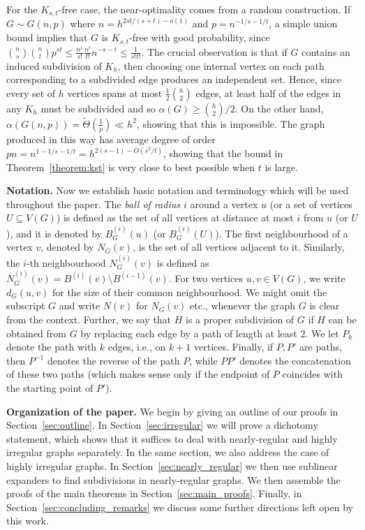 \documentclass[10pt, a4paper]{article}
\numberwithin{theorem}{section} %
\theoremstyle{remark}
\theoremstyle{definition}
\begin{document}
For the $K_{s,t}$-free case, the near-optimality comes from a random construction. If $G\sim G(n, p)$ where $n= h^{2st/(s+t)-o(1)}$ and $p=n^{-1/s-1/t}$, a simple union bound implies that $G$ is $K_{s, t}$-free with good probability, since $\binom{n}{s}\binom{n}{t}p^{st}\leq \frac{n^s}{s!}\frac{n^t}{t!}n^{-s-t}\leq \frac{1}{s!t!}$. The crucial observation is that if $G$ contains an induced subdivision of $K_h$, then choosing one internal vertex on each path corresponding to a subdivided edge produces an independent set. Hence, since every set of $h$ vertices spans at most $\frac{1}{2}\binom{h}{2}$ edges, at least half of the edges in any $K_h$ must be subdivided and so $\alpha(G)\ge \binom{h}{2}/2$. On the other hand, $\alpha(G(n,p))=\tilde \Theta(\frac{1}{p})\ll h^2$, showing that this is impossible. The graph produced in this way has average degree of order $pn=n^{1-1/s-1/t}=h^{2(s-1)-O(s^2/t)}$, showing that the bound in Theorem~\ref{theorem:kst} is very close to best possible when $t$ is large. 

\medskip
\noindent
\textbf{Notation.} Now we establish basic notation and terminology which will be used throughout the paper.  The \textit{ball of radius $i$} around a vertex $u$ (or a set of vertices $U\subseteq V(G)$) is defined as the set of all vertices at distance at most $i$ from $u$ (or $U$), and it is denoted by $B_G^{(i)}(u)$ (or $B_G^{(i)}(U)$).
The first neighbourhood of a vertex $v$, denoted by $N_G(v)$, is the set of all vertices adjacent to it. Similarly, the $i$-th neighbourhood $N_G^{(i)}(v)$ is defined as $N_G^{(i)}(v)=B^{(i)}(v) \setminus B^{(i-1)}(v)$.
For two vertices $u, v\in V(G)$, we write $d_G(u, v)$ for the size of their common neighbourhood.
We might omit the subscript $G$ and write $N(v)$ for $N_G(v)$ etc., whenever the graph $G$ is clear from the context.
Further, we say that $H$ is a proper subdivision of $G$ if $H$ can be obtained from $G$ by replacing each edge by a path of length at least $2$. 
We let $P_k$ denote the path with $k$ edges, i.e., on $k+1$ vertices.
Finally, if $P, P'$ are paths, then $P^{-1}$ denotes the reverse of the path $P$, while $PP'$ denotes the concatenation of these two paths (which makes sense only if the endpoint of $P$ coincides with the starting point of $P'$).


\medskip
\noindent
\textbf{Organization of the paper.} We begin by giving an outline of our proofs in Section~\ref{sec:outline}. In Section~\ref{sec:irregular} we will prove a dichotomy statement, which shows that it suffices to deal with nearly-regular and highly irregular graphs separately. In the same section, we also address the case of highly irregular graphs. In Section~\ref{sec:nearly_regular} we then use sublinear expanders to find subdivisions in nearly-regular graphs. We then assemble the proofs of the main theorems in Section~\ref{sec:main_proofs}. Finally, in Section~\ref{sec:concluding_remarks} we discuss some further directions left open by this work.
\end{document}
